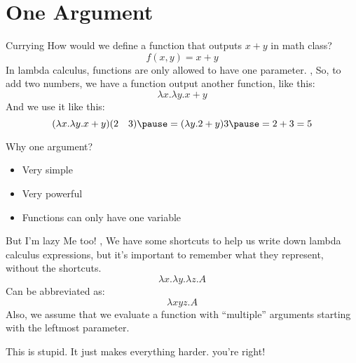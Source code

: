 \section{One Argument}
\begin{namedframe}{Currying}
	How would we define a function that outputs $x + y$ in math class?
	\pause
	\[f(x, y) = x + y\]
	\pause
	In lambda calculus, functions are only allowed to have \alert{one} parameter.
	\sep
	So, to add two numbers, we have a function output another function, like this:
	\[\lambda x . \lambda y . x + y\]
	\pause
	And we use it like this:
	\[(\lambda x . \lambda y . x + y) (2 \quad 3) \pause = (\lambda y . 2 + y) 3 \pause = 2 + 3 = 5\]
\end{namedframe}
\begin{namedframe}{Why one argument?}
	\begin{itemize}[<+->]
		\item Very simple
		\item Very powerful
		\item Functions can only have one variable
	\end{itemize}
\end{namedframe}
\begin{namedframe}{But I'm lazy}
	Me too!
	\sep
	We have some shortcuts to help us write down lambda calculus expressions, but it's important to remember what they represent, without the shortcuts.
	\pause
	\[\lambda x . \lambda y . \lambda z . A\]
	Can be abbreviated as:
	\[\lambda xyz . A\]
	\pause
	Also, we assume that we evaluate a function with ``multiple'' arguments starting with the leftmost parameter.
\end{namedframe}
\begin{namedframe}{This is stupid. It just makes everything harder.}
	you're right!

\end{namedframe}
